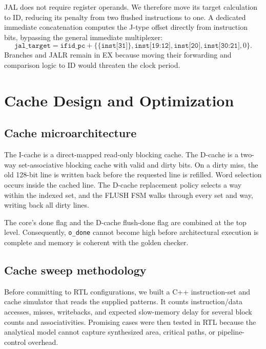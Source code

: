 \documentclass[11pt,a4paper]{article}
\begin{document}
JAL does not require register operands.  We therefore move its target
calculation to ID, reducing its penalty from two flushed instructions to one.
A dedicated immediate concatenation computes the J-type offset directly from
instruction bits, bypassing the general immediate multiplexer:
\[
\texttt{jal\_target} = \texttt{ifid\_pc} +
\{\!\{\texttt{inst[31]}\}\!,\texttt{inst[19:12]},\texttt{inst[20]},
\texttt{inst[30:21]},0\}.
\]
Branches and JALR remain in EX because moving their forwarding and comparison
logic to ID would threaten the clock period.

\section{Cache Design and Optimization}

\subsection{Cache microarchitecture}
The I-cache is a direct-mapped read-only blocking cache.  The D-cache is a
two-way set-associative blocking cache with valid and dirty bits.  On a dirty
miss, the old 128-bit line is written back before the requested line is
refilled.  Word selection occurs inside the cached line.  The D-cache
replacement policy selects a way within the indexed set, and the FLUSH FSM
walks through every set and way, writing back all dirty lines.

The core's done flag and the D-cache flush-done flag are combined at the top
level.  Consequently, \texttt{o\_done} cannot become high before architectural
execution is complete and memory is coherent with the golden checker.

\subsection{Cache sweep methodology}
Before committing to RTL configurations, we built a C++ instruction-set and
cache simulator that reads the supplied patterns.  It counts instruction/data
accesses, misses, writebacks, and expected slow-memory delay for several block
counts and associativities.  Promising cases were then tested in RTL because
the analytical model cannot capture synthesized area, critical paths, or
pipeline-control overhead.
\end{document}
